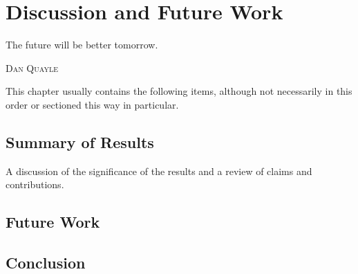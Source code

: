 %
%
%

\chapter{Discussion and Future Work}\label{ch:conclusion}
\epigraph{ The future will be better tomorrow. }
         { \textsc{Dan Quayle} }

This chapter usually contains the following items, although not
necessarily in this order or sectioned this way in particular.

\section{Summary of Results}
A discussion of the significance of the results
and a review of claims and contributions.

\section{Future Work}

\section{Conclusion}
